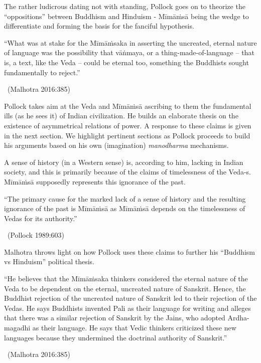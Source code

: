 \vskip 3pt

The rather ludicrous dating not with standing, Pollock goes on to theorize the “oppositions” between Buddhism and Hinduism - Mīmāṁsā being the wedge to differentiate and forming the basis for the fanciful hypothesis.

\vskip 3pt

\begin{myquote}
“What was at stake for the Mīmāṁsaka in asserting the uncreated, eternal nature of language was the possibility that vāṅmaya, or a thing-made-of-language – that is, a text, like the Veda – could be eternal too, something the Buddhists sought fundamentally to reject.”

~\hfill (Malhotra 2016:385)
\end{myquote}

\vskip 3pt

Pollock takes aim at the Veda and Mīmāṁsā ascribing to them the fundamental ills (as he sees it) of Indian civilization. He builds an elaborate thesis on the existence of asymmetrical relations of power. A response to these claims is given in the next section. We highlight pertinent sections as Pollock proceeds to build his arguments based on his own (imagination) \textit{manodharma} mechanisms.

\vskip 2pt

A sense of history (in a Western sense) is, according to him, lacking in Indian society, and this is primarily because of the claims of timelessness of the Veda-s. Mīmāṁsā supposedly represents this ignorance of the past.

\vskip 2pt

\begin{myquote}
“The primary cause for the marked lack of a sense of history and the resulting ignorance of the past is Mīmāṁsā as Mīmāṁsā depends on the timelessness of Vedas for its authority.”

~\hfill (Pollock 1989:603)
\end{myquote}

\vskip 2pt

Malhotra throws light on how Pollock uses these claims to further his “Buddhism vs Hinduism” political thesis.

\begin{myquote}
“He believes that the Mīmāṁsaka thinkers considered the eternal nature of the Veda to be dependent on the eternal, uncreated nature of Sanskrit. Hence, the Buddhist rejection of the uncreated nature of Sanskrit led to their rejection of the Vedas. He says Buddhists invented Pali as their language for writing and alleges that there was a similar rejection of Sanskrit by the Jains, who adopted Ardha-magadhi as their language. He says that Vedic thinkers criticized these new languages because they undermined the doctrinal authority of Sanskrit.”

~\hfill (Malhotra 2016:385)
\end{myquote}

